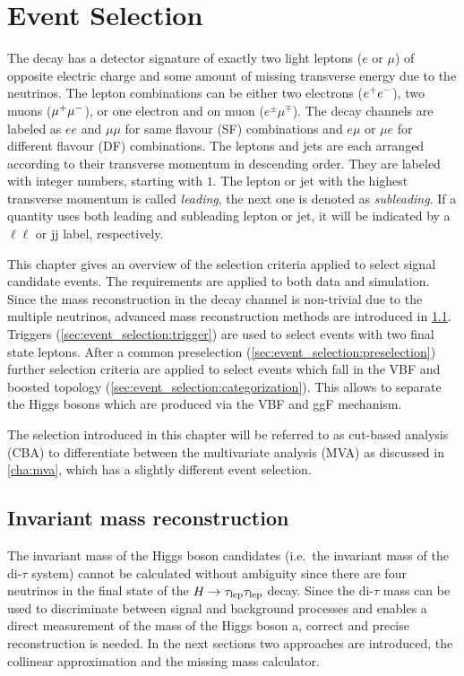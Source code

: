 \chapter{Event Selection}\label{cha:event_selection}

The \Httllfull{} decay has a detector signature of exactly two light leptons ($e$ or $\mu$) of opposite electric
charge and some amount of missing transverse energy due to the neutrinos.
The lepton combinations can be either two electrons ($e^+e^-$), two muons ($\mu^+\mu^-$), or one electron and on muon ($e^\pm \mu^\mp$).
The decay channels are labeled as $ee$ and $\mu\mu$ for same flavour (SF) combinations and $e\mu$ or $\mu e$ for
different flavour (DF) combinations.
The leptons and jets are each arranged according to their transverse momentum in descending order.
They are labeled with integer numbers, starting with $1$.
The lepton or jet with the highest transverse momentum is called \emph{leading},
the next one is denoted as \emph{subleading}.
If a quantity uses both leading and subleading lepton or jet, it will be indicated by a $\ell\ell$ or jj label, respectively.

This chapter gives an overview of the selection criteria applied to select signal candidate events.
The requirements are applied to both data and simulation.
Since the mass reconstruction in the \Httllfull{} decay channel is non-trivial due to the multiple neutrinos,
advanced mass reconstruction methods are introduced in \cref{sec:event_selection:mass}.
Triggers (\cref{sec:event_selection:trigger}) are used to select events with two final state leptons.
After a common preselection (\cref{sec:event_selection:preselection}) further selection criteria are applied
to select events which fall in the VBF and boosted topology (\cref{sec:event_selection:categorization}).
This allows to separate the Higgs bosons which are produced via the VBF and ggF mechanism.

The selection introduced in this chapter will be referred to as cut-based analysis (CBA) to differentiate
between the multivariate analysis (MVA) as discussed in \cref{cha:mva}, which has a slightly different event selection.

\section{Invariant mass reconstruction}\label{sec:event_selection:mass}

The invariant mass of the Higgs boson candidates (i.e.\ the invariant mass of the di-$\tau$ system)
cannot be calculated without ambiguity since there are four neutrinos in the final state of the $H \to \tau_\text{lep} \tau_\text{lep}$ decay.
Since the di-$\tau$ mass can be used to discriminate between signal and background processes and enables
a direct measurement of the mass of the Higgs boson a, correct and precise reconstruction is needed.
In the next sections two approaches are introduced, the collinear approximation and the missing mass calculator.

